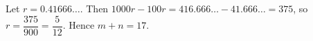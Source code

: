 Let $r=0.41666\ldots$. Then $1000r-100r=416.666\ldots-41.666\ldots=375$, so $r=\dfrac{375}{900}=\dfrac{5}{12}$. Hence $m+n=\boxed{17}$.
